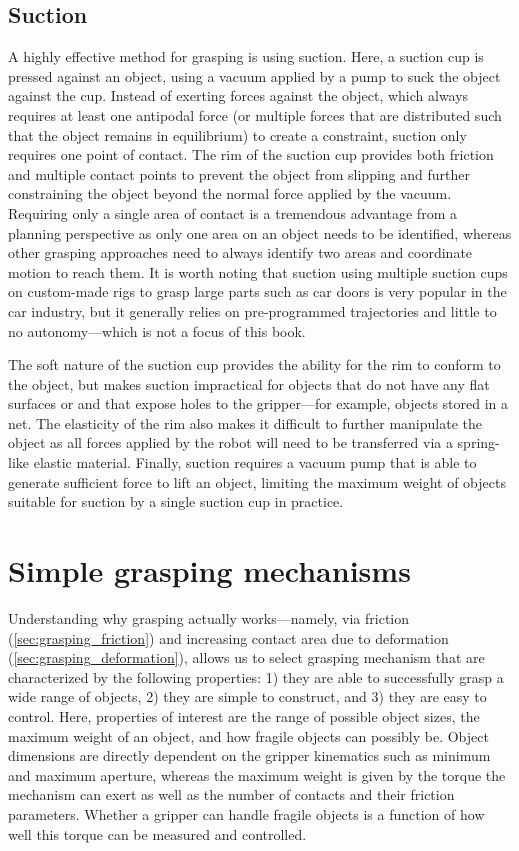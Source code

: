 \subsection{Suction}

A highly effective method for grasping is using suction. Here, a suction cup is pressed against an object, using a vacuum applied by a pump to suck the object against the cup. Instead of exerting forces against the object, which always requires at least one antipodal force (or multiple forces that are distributed such that the object remains in equilibrium) to create a constraint, suction only requires one point of contact. The rim of the suction cup provides both friction and multiple contact points to prevent the object from slipping and further constraining the object beyond the normal force applied by the vacuum.
Requiring only a single area of contact is a tremendous advantage from a planning perspective as only one area on an object needs to be identified, whereas other grasping approaches need to always identify two areas and coordinate motion to reach them.
It is worth noting that suction using multiple suction cups on custom-made rigs to grasp large parts such as car doors is very popular in the car industry, but it generally relies on pre-programmed trajectories and little to no autonomy---which is not a focus of this book.

The soft nature of the suction cup provides the ability for the rim to conform to the object, but makes suction impractical for objects that do not have any flat surfaces or and that expose holes to the gripper---for example, objects stored in a net. The elasticity of the rim also makes it difficult to further manipulate the object as all forces applied by the robot will need to be transferred via a spring-like elastic material. Finally, suction requires a vacuum pump that is able to generate sufficient force to lift an object, limiting the maximum weight of objects suitable for suction by a single suction cup in practice.

\section{Simple grasping mechanisms}\label{sec:simplegrasp}

Understanding why grasping actually works---namely, via friction (\cref{sec:grasping_friction}) and increasing contact area due to deformation (\cref{sec:grasping_deformation}), allows us to select grasping mechanism that are characterized by the following properties: 1) they are able to successfully grasp a wide range of objects, 2) they are simple to construct, and 3) they are easy to control.
Here, properties of interest are the range of possible object sizes, the maximum weight of an object, and how fragile objects can possibly be. Object dimensions are directly dependent on the gripper kinematics such as minimum and maximum aperture, whereas the maximum weight is given by the torque the mechanism can exert as well as the number of contacts and their friction parameters. Whether a gripper can handle fragile objects is a function of how well this torque can be measured and controlled.

